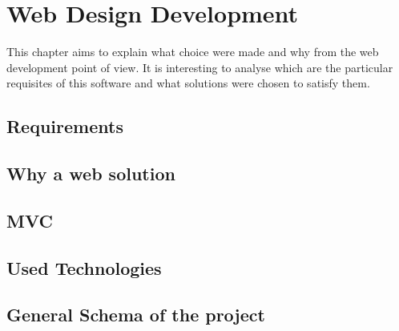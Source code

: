 
\chapter{Web Design Development} %

\label{Chapter 9} %


This chapter aims to explain what choice were made and why from the web development point of view. It is interesting to analyse which are the particular requisites of this software and what solutions were chosen to satisfy them. 

\section{Requirements}




\section{Why a web solution}

\section{MVC}



\section{Used Technologies}


\section{General Schema of the project}


